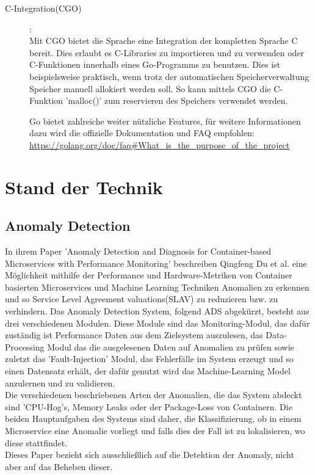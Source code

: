 \documentclass[a4paper,10pt]{scrartcl}
\begin{document}
\begin{description}
\item[C-Integration(CGO)]:\\

Mit CGO bietet die Sprache eine Integration der kompletten Sprache C bereit. Dies erlaubt es  C-Libraries zu importieren und zu verwenden oder C-Funktionen innerhalb eines Go-Programms zu benutzen. Dies ist beispielsweise praktisch, wenn trotz der automatischen Speicherverwaltung Speicher manuell allokiert werden soll. So kann mittels CGO die C-Funktion 'malloc()' zum reservieren des Speichers verwendet werden.

Go bietet zahlreiche weiter nützliche Features, für weitere Informationen dazu wird die offizielle Dokumentation und FAQ empfohlen:\\
\url{https://golang.org/doc/faq#What_is_the_purpose_of_the_project}

\end{description}


\pagebreak

\section{Stand der Technik}

\subsection{Anomaly Detection}
In ihrem Paper 'Anomaly Detection and Diagnosis for Container-based Microservices with Performance Monitoring' beschreiben Qingfeng Du et al. eine Möglichkeit mithilfe der Performance und Hardware-Metriken von Container basierten Microservices und Machine Learning Techniken  Anomalien zu erkennen und so Service Level Agreement valuations(SLAV) zu reduzieren bzw. zu verhindern. Das Anomaly Detection System, folgend ADS abgekürzt, besteht aus drei verschiedenen Modulen. Diese Module sind das Monitoring-Modul, das dafür zuständig ist Performance Daten aus dem Zielsystem auszulesen, das Data-Processing Modul das die ausgelesenen Daten auf Anomalien zu prüfen sowie zuletzt das 'Fault-Injection' Modul, das Fehlerfälle im System erzeugt und so einen Datensatz erhält, der dafür genutzt wird das Machine-Learning Model anzulernen und zu validieren.\\
Die verschiedenen beschriebenen Arten der Anomalien, die das System abdeckt sind 'CPU-Hog's, Memory Leaks oder der Package-Loss von Containern. Die beiden Hauptaufgaben des Systems sind daher, die Klassifizierung, ob in einem Microservice eine Anomalie vorliegt und falls dies der Fall ist zu lokalisieren, wo diese stattfindet.\\
Dieses Paper bezieht sich ausschließlich auf die Detektion der Anomaly, nicht aber auf das Beheben dieser.
\end{document}
